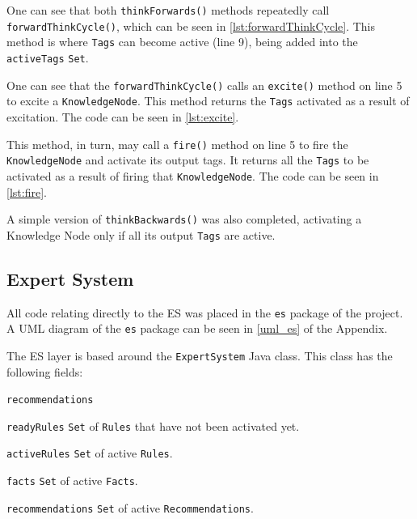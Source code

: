 \documentclass[titlepage,11pt]{article}
\def \knnpath {"C:/Users/Sean/IdeaProjects/Prometheus/src/knn/KnowledgeNodeNetwork.java"}
\newcommand{\code}[1]{\texttt{#1}}
\begin{document}


One can see that both \code{thinkForwards()} methods repeatedly call \code{forwardThinkCycle()}, which can be seen in \autoref{lst:forwardThinkCycle}. This method is where \code{Tags} can become active (line 9), being added into the \code{activeTags} \code{Set}.


One can see that the \code{forwardThinkCycle()} calls an \code{excite()} method on line 5 to excite a \code{KnowledgeNode}. This method returns the \code{Tags} activated as a result of excitation. The code can be seen in \autoref{lst:excite}.



This method, in turn, may call a \code{fire()} method on line 5 to fire the \code{KnowledgeNode} and activate its output tags. It returns all the \code{Tags} to be activated as a result of firing that \code{KnowledgeNode}. The code can be seen in \autoref{lst:fire}.



A simple version of \code{thinkBackwards()} was also completed, activating a Knowledge Node only if all its output \code{Tags} are active.

\subsection{Expert System}

All code relating directly to the ES was placed in the \code{es} package of the project. A UML diagram of the \code{es} package can be seen in \autoref{uml_es} of the Appendix.

The ES layer is based around the \code{ExpertSystem} Java class. This class has the following fields:

\begin{labeling}{\code{recommendations}}
	\item[\code{readyRules}] \code{Set} of \code{Rules} that have not been activated yet.
	\item[\code{activeRules}] \code{Set} of active \code{Rules}.
	\item[\code{facts}] \code{Set} of active \code{Facts}.
	\item[\code{recommendations}] \code{Set} of active \code{Recommendations}.
\end{labeling}
\end{document}
